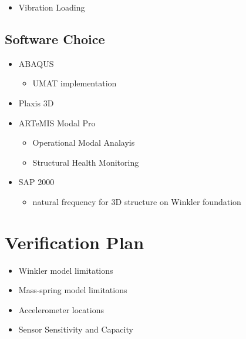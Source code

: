 \documentclass[
  letterpaper,
  DIV=11,
  numbers=noendperiod]{scrreprt}
\providecommand{\tightlist}{%
  \setlength{\itemsep}{0pt}\setlength{\parskip}{0pt}}\usepackage{longtable,booktabs,array}
\begin{document}
\begin{itemize}
\tightlist
\item
  Vibration Loading
\end{itemize}

\hypertarget{software-choice}{%
\subsection{Software Choice}\label{software-choice}}

\begin{itemize}
\item
  ABAQUS

  \begin{itemize}
  \tightlist
  \item
    UMAT implementation
  \end{itemize}
\item
  Plaxis 3D
\item
  ARTeMIS Modal Pro

  \begin{itemize}
  \item
    Operational Modal Analayis
  \item
    Structural Health Monitoring
  \end{itemize}
\item
  SAP 2000

  \begin{itemize}
  \tightlist
  \item
    natural frequency for 3D structure on Winkler foundation
  \end{itemize}
\end{itemize}

\hypertarget{verification-plan}{%
\section{Verification Plan}\label{verification-plan}}

\begin{itemize}
\item
  Winkler model limitations
\item
  Mass-spring model limitations
\item
  Accelerometer locations
\item
  Sensor Sensitivity and Capacity
\end{itemize}
\end{document}

